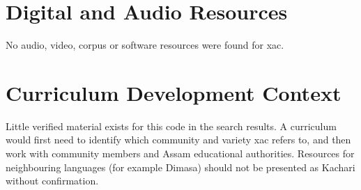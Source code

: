 \documentclass[12pt]{article}
\begin{document}
\section{Digital and Audio Resources}
No audio, video, corpus or software resources were found for xac.

\section{Curriculum Development Context}
Little verified material exists for this code in the search results. A curriculum would first need to identify which community and variety xac refers to, and then work with community members and Assam educational authorities. Resources for neighbouring languages (for example Dimasa) should not be presented as Kachari without confirmation.
\end{document}
